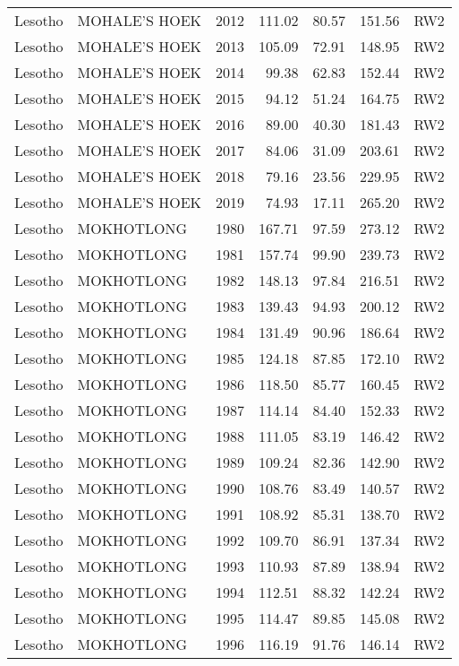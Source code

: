 \begin{longtable}{lllrrrl}
  Lesotho & MOHALE'S HOEK & 2012 & 111.02 & 80.57 & 151.56 & RW2 \\ 
  Lesotho & MOHALE'S HOEK & 2013 & 105.09 & 72.91 & 148.95 & RW2 \\ 
  Lesotho & MOHALE'S HOEK & 2014 & 99.38 & 62.83 & 152.44 & RW2 \\ 
  Lesotho & MOHALE'S HOEK & 2015 & 94.12 & 51.24 & 164.75 & RW2 \\ 
  Lesotho & MOHALE'S HOEK & 2016 & 89.00 & 40.30 & 181.43 & RW2 \\ 
  Lesotho & MOHALE'S HOEK & 2017 & 84.06 & 31.09 & 203.61 & RW2 \\ 
  Lesotho & MOHALE'S HOEK & 2018 & 79.16 & 23.56 & 229.95 & RW2 \\ 
  Lesotho & MOHALE'S HOEK & 2019 & 74.93 & 17.11 & 265.20 & RW2 \\ 
  Lesotho & MOKHOTLONG & 1980 & 167.71 & 97.59 & 273.12 & RW2 \\ 
  Lesotho & MOKHOTLONG & 1981 & 157.74 & 99.90 & 239.73 & RW2 \\ 
  Lesotho & MOKHOTLONG & 1982 & 148.13 & 97.84 & 216.51 & RW2 \\ 
  Lesotho & MOKHOTLONG & 1983 & 139.43 & 94.93 & 200.12 & RW2 \\ 
  Lesotho & MOKHOTLONG & 1984 & 131.49 & 90.96 & 186.64 & RW2 \\ 
  Lesotho & MOKHOTLONG & 1985 & 124.18 & 87.85 & 172.10 & RW2 \\ 
  Lesotho & MOKHOTLONG & 1986 & 118.50 & 85.77 & 160.45 & RW2 \\ 
  Lesotho & MOKHOTLONG & 1987 & 114.14 & 84.40 & 152.33 & RW2 \\ 
  Lesotho & MOKHOTLONG & 1988 & 111.05 & 83.19 & 146.42 & RW2 \\ 
  Lesotho & MOKHOTLONG & 1989 & 109.24 & 82.36 & 142.90 & RW2 \\ 
  Lesotho & MOKHOTLONG & 1990 & 108.76 & 83.49 & 140.57 & RW2 \\ 
  Lesotho & MOKHOTLONG & 1991 & 108.92 & 85.31 & 138.70 & RW2 \\ 
  Lesotho & MOKHOTLONG & 1992 & 109.70 & 86.91 & 137.34 & RW2 \\ 
  Lesotho & MOKHOTLONG & 1993 & 110.93 & 87.89 & 138.94 & RW2 \\ 
  Lesotho & MOKHOTLONG & 1994 & 112.51 & 88.32 & 142.24 & RW2 \\ 
  Lesotho & MOKHOTLONG & 1995 & 114.47 & 89.85 & 145.08 & RW2 \\ 
  Lesotho & MOKHOTLONG & 1996 & 116.19 & 91.76 & 146.14 & RW2 \\ 

\end{longtable}

